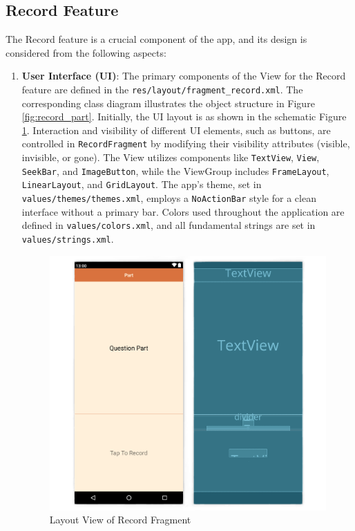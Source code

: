 \documentclass[conference,10pt,letterpaper]{IEEEtran}
\begin{document}
	\subsection{Record Feature}
	The Record feature is a crucial component of the app, and its design is considered from the following aspects:
	\begin{enumerate}
		\item \textbf{User Interface (UI)}: 
		The primary components of the View for the Record feature are defined in the \texttt{res/layout/fragment\_record.xml}. The corresponding class diagram illustrates the object structure in Figure \ref{fig:record_part}. Initially, the UI layout is as shown in the schematic Figure \ref{fig:record_layout}. Interaction and visibility of different UI elements, such as buttons, are controlled in \texttt{RecordFragment} by modifying their visibility attributes (visible, invisible, or gone). The View utilizes components like \texttt{TextView}, \texttt{View}, \texttt{SeekBar}, and \texttt{ImageButton}, while the ViewGroup includes \texttt{FrameLayout}, \texttt{LinearLayout}, and \texttt{GridLayout}. The app's theme, set in \texttt{values/themes/themes.xml}, employs a \texttt{NoActionBar} style for a clean interface without a primary bar. Colors used throughout the application are defined in \texttt{values/colors.xml}, and all fundamental strings are set in \texttt{values/strings.xml}.
		\begin{figure}[htbp]
			\centerline{\includegraphics[width=\columnwidth]{src/record layout remove.png}}
			\caption{Layout View of Record Fragment}
			\label{fig:record_layout}
		\end{figure}
		

\end{enumerate}
\end{document}
